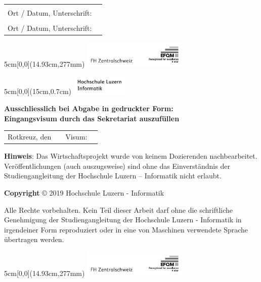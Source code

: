 \vspace{1em}

\noindent
\begin{tabularx}{\textwidth}{@{}lX}
	&\\
	Ort / Datum, Unterschrift: &  \\
	\cline{2-2}
	&\\[0.5cm]
	Ort / Datum, Unterschrift: &  \\
	\cline{2-2}
\end{tabularx}

\begin{textblock*}{5cm}[0,0](14.93cm,277mm)
	\includegraphics[keepaspectratio,width=5cm]{img/FHZ_Logo}
\end{textblock*}

\newpage

\begin{textblock*}{5cm}[0,0](15cm,0.7cm)
	\includegraphics[keepaspectratio,width=2.7cm]{img/HSLU_Logo_Header}
\end{textblock*}

\vspace{0.8cm}
\noindent
\textbf{Ausschliesslich bei Abgabe in gedruckter Form: \\ 
Eingangsvisum durch das Sekretariat auszufüllen}

\noindent
\renewcommand{\arraystretch}{2}
\begin{tabularx}{\textwidth}{@{}lXlX}
	Rotkreuz, den & & Visum: & \\
	\cline{2-2}
	\cline{4-4}
\end{tabularx}
\renewcommand{\arraystretch}{1}

\vfill
\noindent
\textbf{Hinweis}: Das Wirtschaftsprojekt wurde von keinem Dozierenden nachbearbeitet.
Veröffentlichungen (auch auszugsweise) sind ohne das Einverständnis der Studiengangleitung der Hochschule Luzern – Informatik nicht erlaubt.

\vspace{1em}

\noindent
\textbf{Copyright} © 2019 Hochschule Luzern - Informatik

\vspace{1em}
\noindent
Alle Rechte vorbehalten. Kein Teil dieser Arbeit darf ohne die schriftliche Genehmigung der Studiengangleitung der Hochschule Luzern - Informatik in irgendeiner Form reproduziert oder in eine von Maschinen verwendete Sprache übertragen werden.


\begin{textblock*}{5cm}[0,0](14.93cm,277mm)
	\includegraphics[keepaspectratio,width=5cm]{img/FHZ_Logo}
\end{textblock*}
